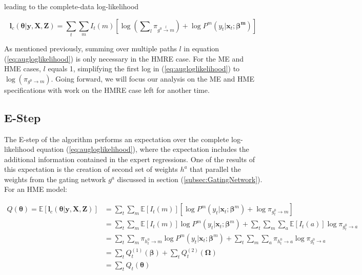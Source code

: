 \documentclass[12pt]{article}
\newcommand{\EIm}[1]{\mathbb{E} \left[ I_{t}(#1) \right]}
\newcommand{\gateprod}[2]{\pi_{#1 \longrightarrow #2}}
\newcommand{\sumgateprod}[3]{\pi_{#1 \overset{#3}{\longrightarrow} #2}}
\newcommand{\shortsum}[1]{\sum \nolimits_{#1}}
\begin{document}
leading to the complete-data log-likelihood

\begin{equation}  \label{eq:augloglikelihood}
  \boldsymbol{l}_{c}(\boldsymbol{\theta}| \boldsymbol{y}, \boldsymbol{X}, \boldsymbol{Z}) = \sum_{t} \sum_{m} I_{t}(m) \left[\log \left( \shortsum{l} \sumgateprod{g^{0}}{m}{l} \right) + \log P^{m}(y_{t}| \boldsymbol{x}_{t}; \boldsymbol{\beta^{m}}) \right]
\end{equation}

As mentioned previously, summing over multiple paths $l$ in equation
(\ref{eq:augloglikelihood}) is only necessary in the HMRE case. For the ME
and HME cases, $l$ equals 1, simplifying the first log in (\ref{eq:augloglikelihood})
to $\log(\gateprod{g^{0}}{m})$. Going forward, we will focus our analysis on
the ME and HME specifications with work on the HMRE case left for another time.

\subsection{E-Step} \label{sec:Estep}
The E-step of the algorithm performs an expectation over the complete
log-likelihood equation (\ref{eq:augloglikelihood}), where the expectation
includes the additional information contained in the expert regressions.
One of the results of this expectation is the creation of second set of
weights $h^{a}$ that parallel the weights from the gating network $g^{a}$
discussed in section (\ref{subsec:GatingNetwork}). For an HME model:

\begin{equation} \label{eq:Estep}
  \begin{split}
  Q(\boldsymbol{\theta}) = \mathbb{E} \left [ \boldsymbol{l}_{c}(\boldsymbol{\theta}| \boldsymbol{y}, \boldsymbol{X}, \boldsymbol{Z}) \right] & = \sum_{t}\sum_{m} \EIm{m} \left[ \log P^{m}(y_{t}| \boldsymbol{x}_{t}; \boldsymbol{\beta}^{m}) + \log \gateprod{g^{0}_{t}}{m} \right] \\ 
   & = \sum_{t} \sum_{m} \EIm{m}  \log P^{m}(y_{t}| \boldsymbol{x}_{t}; \boldsymbol{\beta}^{m})   +       \sum_{t} \sum_{m} \sum_{a} \mathbb{E} \left[ I_{t}(a) \right] \log \gateprod{g^{0}_{t}}{a} \\
   & = \sum_{t} \sum_{m} \gateprod{h^{0}_{t}}{m}  \log P^{m}(y_{t}| \boldsymbol{x}_{t}; \boldsymbol{\beta}^{m})   +       \sum_{t} \sum_{m} \sum_{a} \gateprod{h^{0}_{t}}{a} \log \gateprod{g^{0}_{t}}{a} \\
   & = \sum_{t} Q^{(1)}_{t} (\boldsymbol{\beta}) + \sum_{t} Q^{(2)}_{t} (\boldsymbol{\Omega}) \\
   & = \sum_{t} Q_{t}(\boldsymbol{\theta})
 \end{split}
\end{equation}
\end{document}
